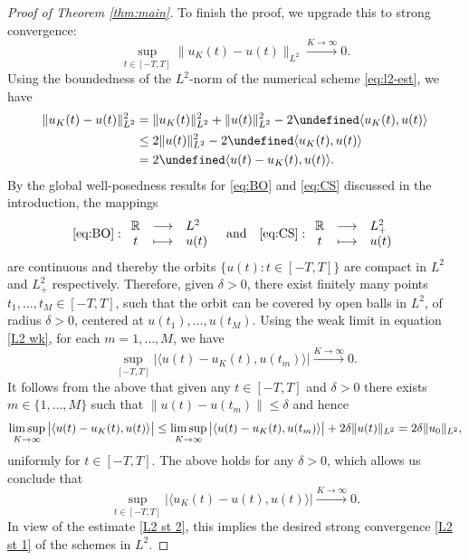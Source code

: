 \documentclass [11pt] {article}
\newcommand{\<}{\langle}
\renewcommand{\>}{\rangle}
\let\Re=\undefined\DeclareMathOperator{\Re}{Re}
\newcommand{\del}{\delta}
\begin{document}
\begin{proof}[Proof of Theorem \ref{thm:main}]
To finish the proof, we upgrade this to strong convergence:
\begin{equation}
\sup_{t\in[-T,T]} \| u_K(t) - u(t) \|_{L^2} \xrightarrow{K\to\infty}
0.
\label{L2 st 1}
\end{equation}
Using the boundedness of the $L^2$-norm of the numerical scheme \eqref{eq:l2-est}, we have
\begin{equation}\label{L2 st 2}
\begin{aligned}
\| u_K(t) - u(t) \|_{L^2}^2 
&= \| u_K(t) \|_{L^2}^2 + \| u(t) \|_{L^2}^2 - 2\Re\langle u_K(t), u(t) \rangle 
 \\
&\le 2 \| u(t) \|_{L^2}^2- 2\Re\langle u_K(t), u(t) \rangle\\
&= 2\Re \langle u(t) - u_K(t), u(t) \rangle.
\end{aligned}
\end{equation}
By the global well-posedness results for \eqref{eq:BO} and \eqref{eq:CS} discussed in the introduction, the mappings
\[ \eqref{eq:BO} : \begin{array}{ccl}
\mathbb{R} &\longrightarrow &L^2\\
t &\longmapsto& u(t)
\end{array} \quad \text{and} \quad
\eqref{eq:CS} : \begin{array}{ccl}
\mathbb{R} &\longrightarrow &L^2_{+}\\
t &\longmapsto& u(t)
\end{array}
\]
are continuous and thereby the orbits $\{ u(t) : t\in [-T,T] \}$ are compact in $L^2$ and $L^2_{+}$ respectively.  Therefore, given $\del>0$, there exist finitely many points $t_1,\dots,t_M \in [-T,T]$, such that the orbit can be covered by open balls in $L^2$, of radius $\del>0$, centered at $u(t_1),\dots,u(t_M)$.  Using the weak limit in equation \eqref{L2 wk}, for each $m=1,\dots,M$, we have
\begin{equation*}
\sup_{[-T,T]}\big| \langle u(t) - u_K(t), u(t_m) \rangle \big| \xrightarrow{K\to\infty}
0.
\end{equation*}
It follows from the above that given any $t\in [-T,T]$  and $\delta> 0$ there exists $m\in \{1,\dots,M\}$ such that $\| u(t) - u(t_m)\| \le \delta$ and hence
\begin{equation*}
\limsup_{K\to\infty} 
\big|\langle u(t) - u_K(t), u(t) \rangle \big| 
\leq \limsup_{K\to\infty}
\big| \langle u(t) - u_K(t), u(t_m) \rangle \big| + 2\del \| u(t) \|_{L^2} \\
= 2\delta\| u_0\|_{L^2},
\end{equation*}
uniformly for $t\in[-T,T]$.
The above holds for any $\del>0$, which allows us conclude that
\begin{equation*}
\sup_{t\in[-T,T]} \big| \langle u_K(t) - u(t), u(t) \rangle \big| \xrightarrow{K\to\infty}
0.
\end{equation*}
In view of the estimate \eqref{L2 st 2}, this implies the desired strong convergence \eqref{L2 st 1} of the schemes in $L^2$.
\end{proof}















\end{document}
